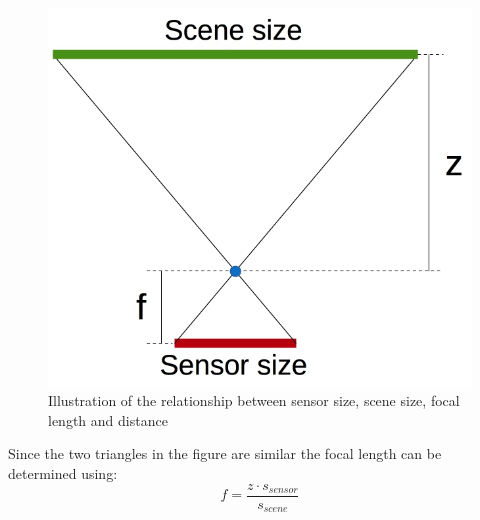 \begin{figure}[ht!]
  \centering
  \includegraphics[scale=0.375]{figures/scenesize}
  \caption{Illustration of the relationship between sensor size, scene size, focal length and distance}
  \label{fig:scenesize}
\end{figure}
Since the two triangles in the figure are similar the focal length can be determined using:
\begin{equation}
 f = \frac{z \cdot s_{sensor}}{s_{scene}}
\end{equation}


